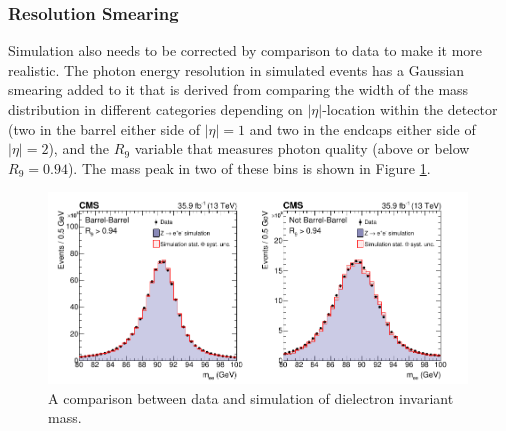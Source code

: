 \subsubsection{Resolution Smearing}
Simulation also needs to be corrected by comparison to data to make it more realistic. The photon energy resolution in simulated events has a Gaussian smearing added to it that is derived from comparing the width of the \Zee mass distribution in different categories depending on $|\eta|$-location within the detector (two in the barrel either side of $|\eta|=1$ and two in the endcaps either side of $|\eta|=2$), and the $R_{9}$ variable that measures photon quality (above or below $R_{9}=0.94$).
The mass peak in two of these bins is shown in Figure \ref{fig:object_reco:invariant_mass_validation}.
\begin{figure}[h!]
    \centering
    \includegraphics[width=0.99\textwidth]{figures/object_reco/CMS-HIG-16-040_Figure_001.pdf}
    \caption{A comparison between data and simulation of dielectron invariant mass.}
        \label{fig:object_reco:invariant_mass_validation}
\end{figure}

